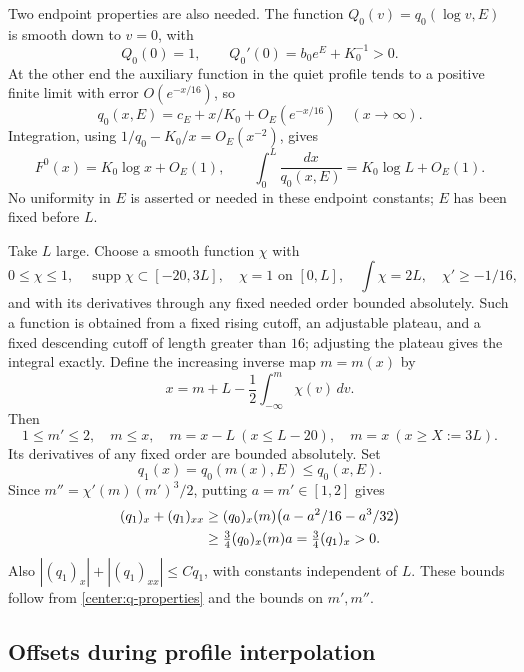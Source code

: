 Two endpoint properties are also needed. The function $Q_0(v)=q_0(\log v,E)$ is smooth down to $v=0$, with
\begin{equation}\label{center:left-slope}
 Q_0(0)=1,\qquad Q_0'(0)=b_0e^E+K_0^{-1}>0.
\end{equation}
At the other end the auxiliary function in the quiet profile tends to a positive finite limit with error $O(e^{-x/16})$, so
\[
 q_0(x,E)=c_E+x/K_0+O_E(e^{-x/16})\quad(x\longrightarrow\infty).
\]
Integration, using $1/q_0-K_0/x=O_E(x^{-2})$, gives
\begin{equation}\label{center:primitive-asymptotic}
 F^0(x)=K_0\log x+O_E(1),\qquad
 \int_0^L\frac{dx}{q_0(x,E)}=K_0\log L+O_E(1).
\end{equation}
No uniformity in $E$ is asserted or needed in these endpoint constants; $E$ has been fixed before $L$.

Take $L$ large. Choose a smooth function $\chi$ with
\[
 0\le\chi\le1,\quad \operatorname{supp}\chi\subset[-20,3L],\quad
 \chi=1\text{ on }[0,L],\quad \int\chi=2L,\quad \chi'\ge-1/16,
\]
and with its derivatives through any fixed needed order bounded absolutely. Such a function is obtained from a fixed rising cutoff, an adjustable plateau, and a fixed descending cutoff of length greater than $16$; adjusting the plateau gives the integral exactly. Define the increasing inverse map $m=m(x)$ by
\begin{equation}\label{center:inverse-map}
 x=m+L-\frac12\int_{-\infty}^m\chi(v)\,dv.
\end{equation}
Then
\begin{equation}\label{center:map-bounds}
 1\le m'\le2,\quad m\le x,\quad
 m=x-L\ (x\le L-20),\quad m=x\ (x\ge X:=3L).
\end{equation}
Its derivatives of any fixed order are bounded absolutely. Set
\[
 q_1(x)=q_0(m(x),E)\le q_0(x,E).
\]
Since $m''=\chi'(m)(m')^3/2$, putting $a=m'\in[1,2]$ gives
\begin{align}\label{center:q1-positive}
 (q_1)_x+(q_1)_{xx}
 &\ge(q_0)_x(m)\bigl(a-a^2/16-a^3/32\bigr)\\
 &\ge\tfrac34(q_0)_x(m)a=\tfrac34(q_1)_x>0.\notag
\end{align}
Also $|(q_1)_x|+|(q_1)_{xx}|\le Cq_1$, with constants independent of $L$. These bounds follow from \eqref{center:q-properties} and the bounds on $m',m''$.

\subsection{Offsets during profile interpolation}

